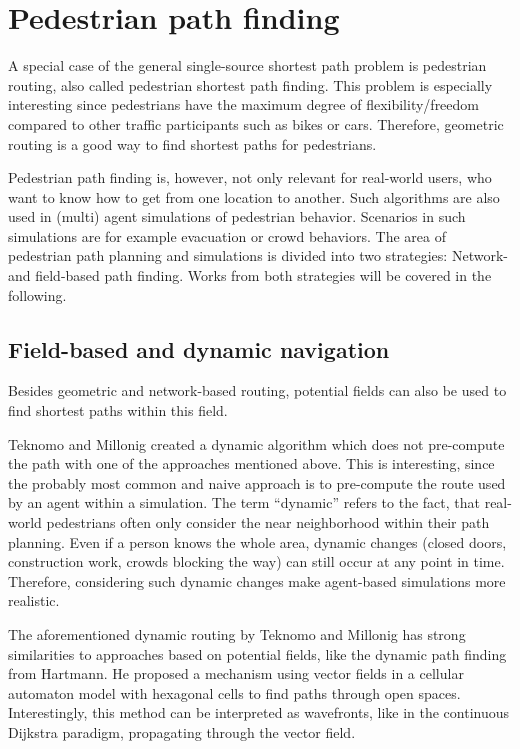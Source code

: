 \section{Pedestrian path finding}
\label{sec:pedestrian-path-planning}
	
	A special case of the general single-source shortest path problem is pedestrian routing, also called pedestrian shortest path finding.
	This problem is especially interesting since pedestrians have the maximum degree of flexibility/freedom compared to other traffic participants such as bikes or cars.
	Therefore, geometric routing is a good way to find shortest paths for pedestrians.
	
	Pedestrian path finding is, however, not only relevant for real-world users, who want to know how to get from one location to another.
	Such algorithms are also used in (multi) agent simulations of pedestrian behavior.
	Scenarios in such simulations are for example evacuation or crowd behaviors.
	The area of pedestrian path planning and simulations is divided into two strategies: Network- and field-based path finding\cite{hartmann-geodesic}.
	Works from both strategies will be covered in the following.
	
	\subsection{Field-based and dynamic navigation}
	
		Besides geometric and network-based routing, potential fields can also be used to find shortest paths within this field.
		
		Teknomo and Millonig created a dynamic algorithm which does not pre-compute the path with one of the approaches mentioned above\cite{teknomo-millonig-routing}.
		This is interesting, since the probably most common and naive approach is to pre-compute the route used by an agent within a simulation.
		The term \enquote{dynamic} refers to the fact, that real-world pedestrians often only consider the near neighborhood within their path planning.
		Even if a person knows the whole area, dynamic changes (closed doors, construction work, crowds blocking the way) can still occur at any point in time.
		Therefore, considering such dynamic changes make agent-based simulations more realistic.
		
		The aforementioned dynamic routing by Teknomo and Millonig has strong similarities to approaches based on potential fields, like the dynamic path finding from Hartmann\cite{hartmann-geodesic}.
		He proposed a mechanism using vector fields in a cellular automaton model with hexagonal cells to find paths through open spaces.
		Interestingly, this method can be interpreted as wavefronts, like in the continuous Dijkstra paradigm, propagating through the vector field.
			
